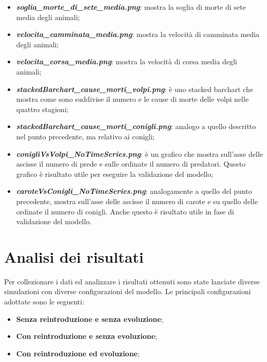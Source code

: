 \documentclass[11pt]{article}
\begin{document}
\begin{itemize}
\begin{itemize}
        \item \textbf{\textit{soglia\_morte\_di\_sete\_media.png}}: mostra la soglia di morte di sete media degli animali;
        \item \textbf{\textit{velocita\_camminata\_media.png}}: mostra la velocità di camminata media degli animali;
        \item \textbf{\textit{velocita\_corsa\_media.png}}: mostra la velocità di corsa media degli animali;
        \item \textbf{\textit{stackedBarchart\_cause\_morti\_volpi.png}}: è uno stacked barchart che mostra come sono suddivise il numero e le cause di morte delle volpi nelle quattro stagioni;
        \item \textbf{\textit{stackedBarchart\_cause\_morti\_conigli.png}}: analogo a quello descritto nel punto precedente, ma relativo ai conigli;
        \item \textbf{\textit{conigliVsVolpi\_NoTimeSeries.png}}: è un grafico che mostra sull'asse delle ascisse il numero di prede e sulle ordinate il numero di predatori. Questo grafico è risultato utile per eseguire la validazione del modello;
        \item \textbf{\textit{caroteVsConigli\_NoTimeSeries.png}}: analogamente a quello del punto precedente, mostra sull'asse delle ascisse il numero di carote e su quello delle ordinate il numero di conigli. Anche questo è risultato utile in fase di validazione del modello.
    \end{itemize}
\end{itemize}


\section{Analisi dei risultati}
Per collezionare i dati ed analizzare i risultati ottenuti sono state lanciate diverse simulazioni con diverse configurazioni del modello. Le principali configurazioni adottate sono le seguenti: 
\begin{itemize}
    \item \textbf{Senza reintroduzione e senza evoluzione};
    \item \textbf{Con reintroduzione e senza evoluzione};
    \item \textbf{Con reintroduzione ed evoluzione};
\end{itemize}

\vspace{1cm}
\end{document}
